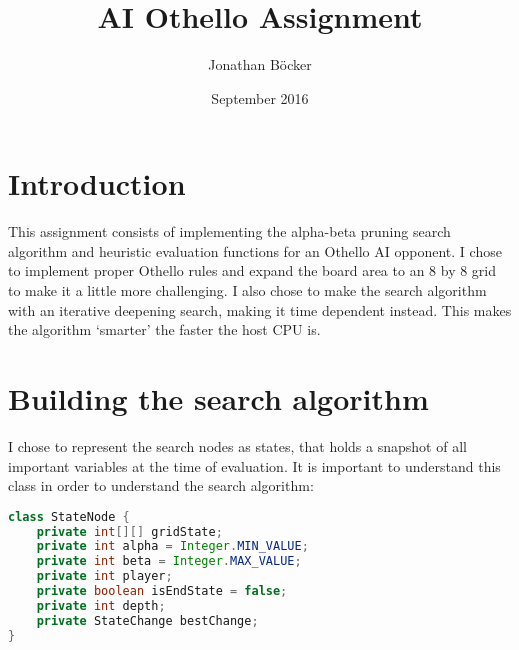 \documentclass{article}
\title{AI Othello Assignment}
\author{Jonathan Böcker}
\date{September 2016}
\begin{document}
\maketitle

\section{Introduction}

This assignment consists of implementing the alpha-beta pruning search algorithm \citep{russel2010artifical}
and heuristic evaluation functions for an Othello AI opponent. I chose to implement
proper Othello rules and expand the board area to an 8 by 8 grid to make it a little
more challenging. I also chose to make the search algorithm with an iterative deepening search,
making it time dependent instead.
This makes the algorithm `smarter' the faster the host CPU is.

\section{Building the search algorithm}

I chose to represent the search nodes as states, that holds a snapshot of all important
variables at the time of evaluation. It is important to understand this class in order to understand
the search algorithm:

\begin{lstlisting}[language=Java]
class StateNode {
    private int[][] gridState;
    private int alpha = Integer.MIN_VALUE;
    private int beta = Integer.MAX_VALUE;
    private int player;
    private boolean isEndState = false;
    private int depth;
    private StateChange bestChange;
}
\end{lstlisting}
\end{document}

